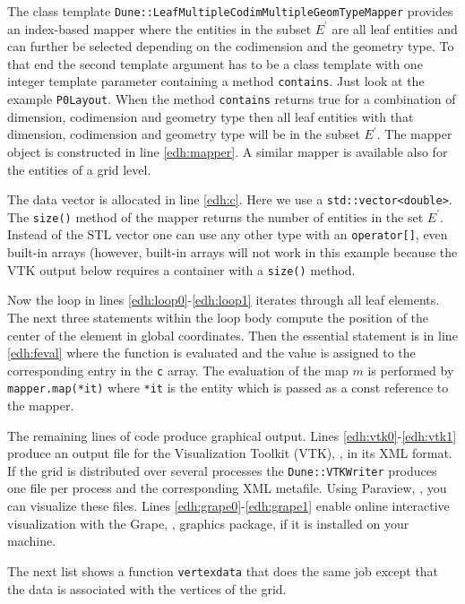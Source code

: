 \documentclass[11pt,a4paper,headinclude,footinclude,DIV16,headings=normal]{scrreprt}
\begin{document}
The class template
\lstinline!Dune::LeafMultipleCodimMultipleGeomTypeMapper!  provides an
index-based mapper where the entities in the subset $E^\prime$ are all
leaf entities and can further be selected depending on the codimension
and the geometry type. To that end the second template argument has to
be a class template with one integer template parameter containing a
method \lstinline!contains!. Just look at the example
\lstinline!P0Layout!. When the method \lstinline!contains!  returns
true for a combination of dimension, codimension and geometry type
then all leaf entities with that dimension, codimension and geometry
type will be in the subset $E^\prime$. The mapper object is
constructed in line \ref{edh:mapper}. A similar mapper is available
also for the entities of a grid level.

The data vector is allocated in line \ref{edh:c}. Here we use a
\lstinline!std::vector<double>!. The \lstinline!size()! method of the
mapper returns the number of entities in the set $E^\prime$. Instead
of the STL vector one can use any other type with an
\lstinline!operator[]!, even built-in arrays (however, built-in arrays
will not work in this example because the VTK output
below requires a container with a
\lstinline!size()! method.

Now the loop in lines \ref{edh:loop0}-\ref{edh:loop1} iterates through
all leaf elements. The next three statements within the loop body
compute the position of the center of the element in global
coordinates. Then the essential statement is in line \ref{edh:feval}
where the function is evaluated and the value is assigned to the
corresponding entry in the \lstinline!c! array. The evaluation of the
map $m$ is performed by \lstinline!mapper.map(*it)!  where
\lstinline!*it! is the entity which is passed as a const reference to
the mapper.

The remaining lines of code produce graphical output. Lines
\ref{edh:vtk0}-\ref{edh:vtk1} produce an output file for the
Visualization Toolkit (VTK), \cite{VTK}, in its XML format. If the
grid is distributed over several processes the
\lstinline!Dune::VTKWriter! produces one file per process and the
corresponding XML metafile. Using Paraview, \cite{Paraview}, you can
visualize these files. Lines \ref{edh:grape0}-\ref{edh:grape1} enable
online interactive visualization with the Grape, \cite{Grape},
graphics package, if it is installed on your machine.

The next list shows a function \lstinline!vertexdata! that does the
same job except that the data is associated with the vertices of the
grid.
\end{document}
